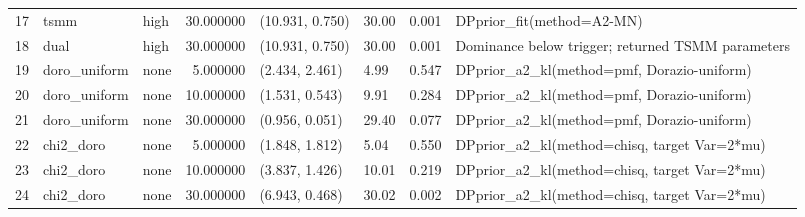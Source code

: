 \begin{tabular}{lllrllll}
17 & tsmm & high & 30.000000 & (10.931, 0.750) & 30.00 & 0.001 & DPprior_fit(method=A2-MN) \\
18 & dual & high & 30.000000 & (10.931, 0.750) & 30.00 & 0.001 & Dominance below trigger; returned TSMM parameters \\
19 & doro_uniform & none & 5.000000 & (2.434, 2.461) & 4.99 & 0.547 & DPprior_a2_kl(method=pmf, Dorazio-uniform) \\
20 & doro_uniform & none & 10.000000 & (1.531, 0.543) & 9.91 & 0.284 & DPprior_a2_kl(method=pmf, Dorazio-uniform) \\
21 & doro_uniform & none & 30.000000 & (0.956, 0.051) & 29.40 & 0.077 & DPprior_a2_kl(method=pmf, Dorazio-uniform) \\
22 & chi2_doro & none & 5.000000 & (1.848, 1.812) & 5.04 & 0.550 & DPprior_a2_kl(method=chisq, target Var=2*mu) \\
23 & chi2_doro & none & 10.000000 & (3.837, 1.426) & 10.01 & 0.219 & DPprior_a2_kl(method=chisq, target Var=2*mu) \\
24 & chi2_doro & none & 30.000000 & (6.943, 0.468) & 30.02 & 0.002 & DPprior_a2_kl(method=chisq, target Var=2*mu) \\
\bottomrule
\end{tabular}

